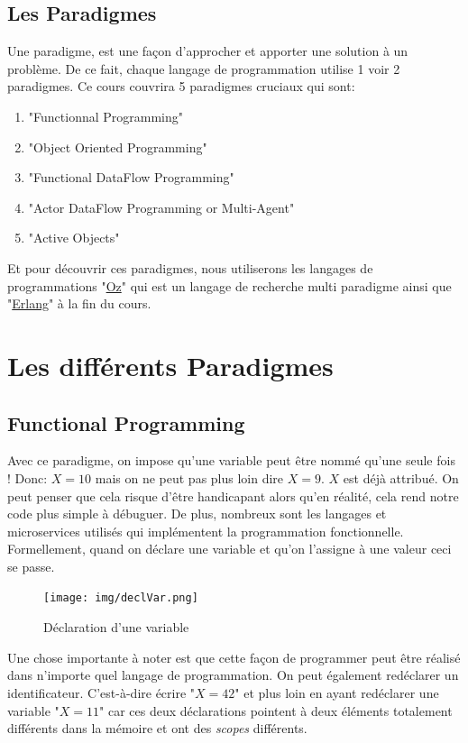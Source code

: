 \documentclass{report}
\begin{document}
\section{Les Paradigmes}
Une paradigme, est une façon d'approcher et apporter une solution à un problème. De ce fait, chaque langage de programmation utilise 1 voir 2 paradigmes. Ce cours couvrira 5 paradigmes cruciaux qui sont:
\begin{enumerate}
\item "Functionnal Programming"
\item "Object Oriented Programming"
\item "Functional DataFlow Programming"
\item "Actor DataFlow Programming or Multi-Agent"
\item "Active Objects"
\end{enumerate}

Et pour découvrir ces paradigmes, nous utiliserons les langages de programmations "\href{https://fr.wikipedia.org/wiki/Oz_(langage)}{Oz}" qui est un langage de recherche multi paradigme ainsi que "\href{https://fr.wikipedia.org/wiki/Erlang_(langage)}{Erlang}" à la fin du cours.

\chapter{Les différents Paradigmes}
\section{Functional Programming}
Avec ce paradigme, on impose qu'une variable peut être nommé qu'une seule fois ! Donc: $X = 10$ mais on ne peut pas plus loin dire $X = 9$. $X$ est déjà attribué. On peut penser que cela risque d'être handicapant alors qu'en réalité, cela rend notre code plus simple à débuguer. De plus, nombreux sont les langages et microservices utilisés qui implémentent la programmation fonctionnelle.
Formellement, quand on déclare une variable et qu'on l'assigne à une valeur ceci se passe.
\begin{figure}
	\centering
    \texttt{[image: img/declVar.png]}
    \caption{Déclaration d'une variable}
\end{figure}
Une chose importante à noter est que cette façon de programmer peut être réalisé dans n'importe quel langage de programmation. On peut également redéclarer un identificateur. C'est-à-dire écrire "$X = 42$" et plus loin en ayant redéclarer une variable "$X = 11$" car ces deux déclarations pointent à deux éléments totalement différents dans la mémoire et ont des \textit{scopes} différents.\\
\end{document}
